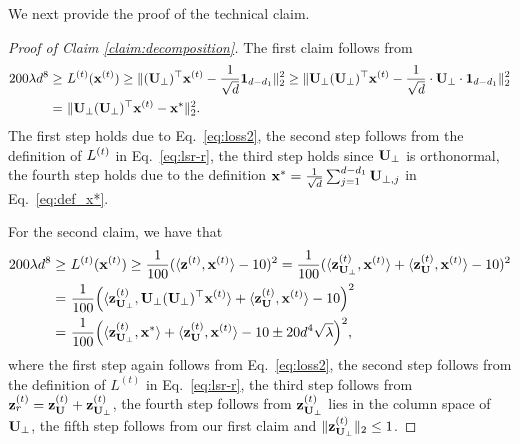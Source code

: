 We next provide the proof of the technical claim.

\begin{proof}[Proof of Claim \ref{claim:decomposition}]
The first claim follows from
\begin{align*}
200\lambda d^8 \geq &~ L^{(t)}(\mathbf{x}^{(t)}) \geq \|(\mathbf{U}_\perp)^\top\mathbf{x}^{(t)} - \frac{1}{\sqrt{d}}\mathbf{1}_{d-d_1}\|_2^2 
\geq \|\mathbf{U}_\perp (\mathbf{U}_\perp)^\top\mathbf{x}^{(t)} - \frac{1}{\sqrt{d}} \cdot \mathbf{U}_\perp \cdot \mathbf{1}_{d-d_1}\|_2^2\\
= &~ \|\mathbf{U}_\perp(\mathbf{U}_\perp)^\top\mathbf{x}^{(t)} - \mathbf{x}^{*}\|_2^2.
\end{align*}
The first step holds due to Eq.~\eqref{eq:loss2}, the second step follows from the definition of $L^{(t)}$ in Eq.~\eqref{eq:lsr-r}, the third step holds since $\mathbf{U}_\perp$ is orthonormal, the fourth step holds due to the definition $\mathbf{x}^{*} = \frac{1}{\sqrt{d}} \sum_{j=1}^{d-d_1} \mathbf{U}_{\perp,j}$ in Eq.~\eqref{eq:def_x*}.

For the second claim, we have that
\begin{align*}
200\lambda d^8 \geq &~ L^{(t)}(\mathbf{x}^{(t)}) \geq \frac{1}{100}(\langle \mathbf{z}^{(t)}, \mathbf{x}^{(t)}\rangle - 10)^2 = \frac{1}{100}(\langle \mathbf{z}_{\mathbf{U}_\perp}^{(t)}, \mathbf{x}^{(t)}\rangle + \langle \mathbf{z}_{ \mathbf{U}}^{(t)}, \mathbf{x}^{(t)}\rangle - 10)^2 \\
= &~ \frac{1}{100}\Big(\langle \mathbf{z}_{\mathbf{U}_\perp}^{(t)}, \mathbf{U}_\perp (\mathbf{U}_\perp)^{\top}\mathbf{x}^{(t)}\rangle + \langle \mathbf{z}_{\mathbf{U}}^{(t)}, \mathbf{x}^{(t)} \rangle - 10\Big)^2 \\
= &~ \frac{1}{100} \Big(\langle \mathbf{z}_{\mathbf{U}_\perp}^{(t)}, \mathbf{x}^{*}\rangle + \langle \mathbf{z}_{\mathbf{U}}^{(t)}, \mathbf{x}^{(t)} \rangle - 10 \pm 20d^4\sqrt{\lambda} \Big)^2,
\end{align*}
where the first step again follows from Eq.~\eqref{eq:loss2}, the second step follows from the definition of $L^{(t)}$ in Eq.~\eqref{eq:lsr-r}, the third step follows from $\mathbf{z}_{r}^{(t)} = \mathbf{z}_{ \mathbf{U}}^{(t)} + \mathbf{z}_{\mathbf{U}_{\perp}}^{(t)}$, the fourth step follows from $\mathbf{z}_{\mathbf{U}_\perp}^{(t)}$ lies in the column space of $\mathbf{U}_\perp$, the fifth step follows from our first claim and $\|\mathbf{z}_{\mathbf{U}_\perp}^{(t)}\|_2 \leq 1$.


\end{proof}
